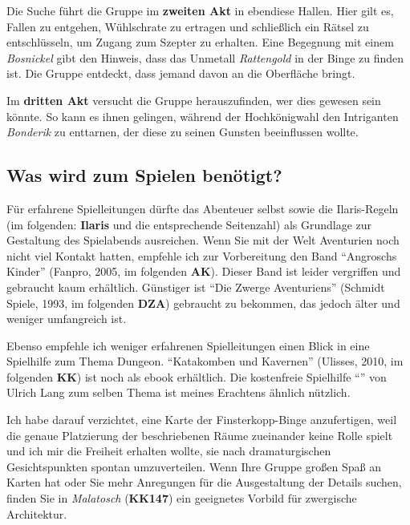 \documentclass[openright]{Ilaris}
\begin{document}

Die Suche führt die Gruppe im \textbf{zweiten Akt} in ebendiese Hallen.
Hier gilt es, Fallen zu entgehen, Wühlschrate zu ertragen und schließlich ein Rätsel zu entschlüsseln, um Zugang zum Szepter zu erhalten.
Eine Begegnung mit einem \emph{Bosnickel} gibt den Hinweis, dass das Unmetall \emph{Rattengold} in der Binge zu finden ist. Die Gruppe entdeckt, dass jemand davon an die Oberfläche bringt.

Im \textbf{dritten Akt} versucht die Gruppe herauszufinden, wer dies gewesen sein könnte.
So kann es ihnen gelingen, während der Hochkönigwahl den Intriganten \emph{Bonderik} zu enttarnen, der diese zu seinen Gunsten beeinflussen wollte.

\subsection{Was wird zum Spielen benötigt?}
Für erfahrene Spielleitungen dürfte das Abenteuer selbst sowie die Ilaris-Regeln (im folgenden: \textbf{Ilaris} und die entsprechende Seitenzahl) als Grundlage zur Gestaltung des Spielabends ausreichen.
Wenn Sie mit der Welt Aventurien noch nicht viel Kontakt hatten, empfehle ich zur Vorbereitung den Band \enquote{Angroschs Kinder} (Fanpro, 2005, im folgenden \textbf{AK}).
Dieser Band ist leider vergriffen und gebraucht kaum erhältlich.
Günstiger ist \enquote{Die Zwerge Aventuriens} (Schmidt Spiele, 1993, im folgenden \textbf{DZA}) gebraucht zu bekommen, das jedoch älter und weniger umfangreich ist.

Ebenso empfehle ich weniger erfahrenen Spielleitungen einen Blick in eine Spielhilfe zum Thema Dungeon. \enquote{Katakomben und Kavernen} (Ulisses, 2010, im folgenden \textbf{KK})
ist noch als ebook erhältlich.
Die kostenfreie Spielhilfe \enquote{} von Ulrich Lang
zum selben Thema ist meines Erachtens ähnlich nützlich.

Ich habe darauf verzichtet, eine Karte der Finsterkopp-Binge anzufertigen, weil die genaue Platzierung der beschriebenen Räume zueinander keine Rolle spielt und ich mir die Freiheit erhalten wollte, sie nach dramaturgischen Gesichtspunkten spontan umzuverteilen. Wenn Ihre Gruppe großen Spaß an Karten hat oder Sie mehr Anregungen für die Ausgestaltung der Details suchen, finden Sie in \emph{Malatosch} (\textbf{KK147}) ein geeignetes Vorbild für zwergische Architektur.
\end{document}
